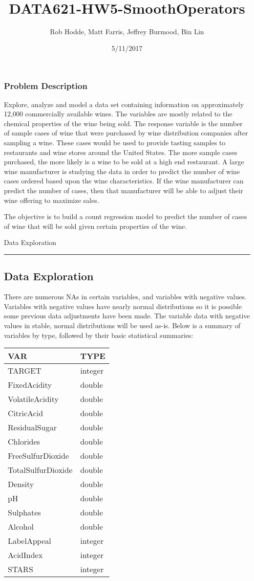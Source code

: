\documentclass[]{article}
\title{DATA621-HW5-SmoothOperators}
\author{Rob Hodde, Matt Farris, Jeffrey Burmood, Bin Lin}
\date{5/11/2017}
\begin{document}
\maketitle

\subsubsection{Problem Description}\label{problem-description}

Explore, analyze and model a data set containing information on
approximately 12,000 commercially available wines. The variables are
mostly related to the chemical properties of the wine being sold. The
response variable is the number of sample cases of wine that were
purchased by wine distribution companies after sampling a wine. These
cases would be used to provide tasting samples to restaurants and wine
stores around the United States. The more sample cases purchased, the
more likely is a wine to be sold at a high end restaurant. A large wine
manufacturer is studying the data in order to predict the number of wine
cases ordered based upon the wine characteristics. If the wine
manufacturer can predict the number of cases, then that manufacturer
will be able to adjust their wine offering to maximize sales.

The objective is to build a count regression model to predict the number
of cases of wine that will be sold given certain properties of the wine.

\begin{center}
{\huge Data Exploration}
\end{center}

\begin{center}\rule{0.5\linewidth}{\linethickness}\end{center}

\subsection{Data Exploration}\label{data-exploration}

There are numerous NAs in certain variables, and variables with negative
values. Variables with negative values have nearly normal distributions
so it is possible some previous data adjustments have been made. The
variable data with negative values in stable, normal distributions will
be used as-is. Below is a summary of variables by type, followed by
their basic statistical summaries:

\begin{longtable}[]{@{}ll@{}}
\toprule
VAR & TYPE\tabularnewline
\midrule
\endhead
TARGET & integer\tabularnewline
FixedAcidity & double\tabularnewline
VolatileAcidity & double\tabularnewline
CitricAcid & double\tabularnewline
ResidualSugar & double\tabularnewline
Chlorides & double\tabularnewline
FreeSulfurDioxide & double\tabularnewline
TotalSulfurDioxide & double\tabularnewline
Density & double\tabularnewline
pH & double\tabularnewline
Sulphates & double\tabularnewline
Alcohol & double\tabularnewline
LabelAppeal & integer\tabularnewline
AcidIndex & integer\tabularnewline
STARS & integer\tabularnewline
\bottomrule
\end{longtable}
\end{document}

